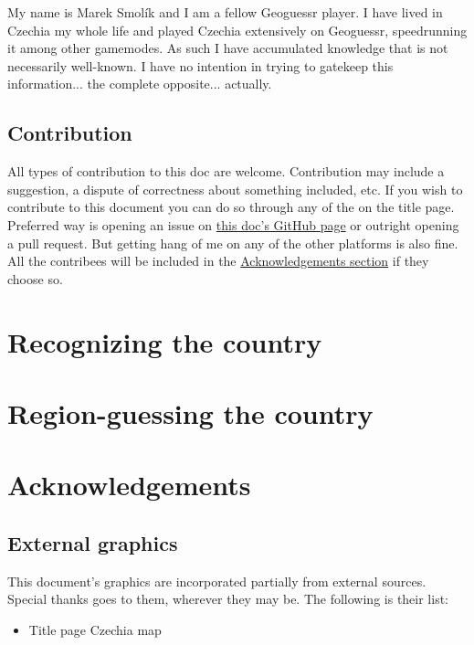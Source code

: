 \documentclass[12pt, oneside]{article}
\begin{document}
My name is Marek Smolík and I am a fellow Geoguessr player. I have lived in Czechia my whole life and played Czechia extensively on Geoguessr, speedrunning it among other gamemodes. As such I have accumulated knowledge that is not necessarily well-known. I have no intention in trying to gatekeep this information... the complete opposite... actually.

\subsection{Contribution}

All types of contribution to this doc are welcome. Contribution may include a suggestion, a dispute of correctness about something included, etc. If you wish to contribute to this document you can do so through any of the on the title page. Preferred way is opening an issue on \href{https://github.com/dynamo58/geoguessr-czechia-guide}{this doc's GitHub page} or outright opening a pull request. But getting hang of me on any of the other platforms is also fine. All the contribees will be included in the \hyperref[sec:ack]{Acknowledgements section} if they choose so.

\newpage
\section{Recognizing the country}

\newpage
\section{Region-guessing the country}

\newpage
\section{Acknowledgements}
\label{sec:ack}

\subsection{External graphics}

This document's graphics are incorporated partially from external sources. Special thanks goes to them, wherever they may be. The following is their list:

\begin{itemize}
  \item Title page Czechia map\cite{gr1}
\end{itemize}
\end{document}
